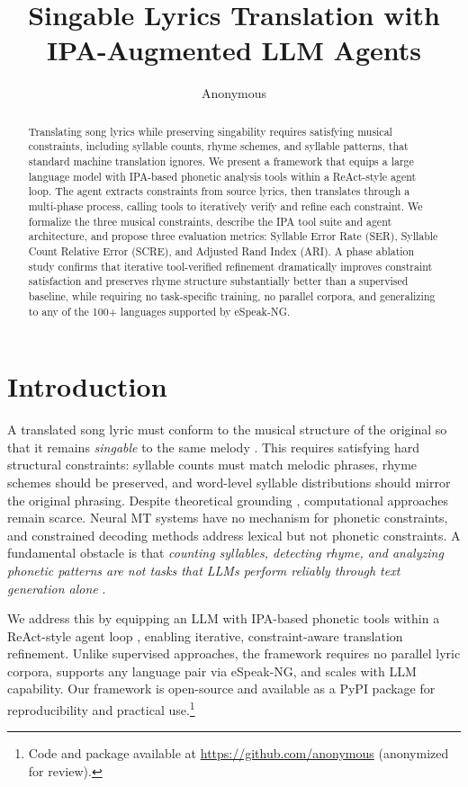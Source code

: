 \documentclass[11pt]{article}
\title{Singable Lyrics Translation with IPA-Augmented LLM Agents}
\author{Anonymous}
\begin{document}
\maketitle

\begin{abstract}
Translating song lyrics while preserving singability requires satisfying musical constraints, including syllable counts, rhyme schemes, and syllable patterns, that standard machine translation ignores.
We present a framework that equips a large language model with IPA-based phonetic analysis tools within a ReAct-style agent loop.
The agent extracts constraints from source lyrics, then translates through a multi-phase process, calling tools to iteratively verify and refine each constraint.
We formalize the three musical constraints, describe the IPA tool suite and agent architecture, and propose three evaluation metrics: Syllable Error Rate (SER), Syllable Count Relative Error (SCRE), and Adjusted Rand Index (ARI).
A phase ablation study confirms that iterative tool-verified refinement dramatically improves constraint satisfaction and preserves rhyme structure substantially better than a supervised baseline, while requiring no task-specific training, no parallel corpora, and generalizing to any of the 100+ languages supported by eSpeak-NG.
\end{abstract}

\section{Introduction}

A translated song lyric must conform to the musical structure of the original so that it remains \emph{singable} to the same melody \citep{low-2005-pentathlon}.
This requires satisfying hard structural constraints: syllable counts must match melodic phrases, rhyme schemes should be preserved, and word-level syllable distributions should mirror the original phrasing.
Despite theoretical grounding \citep{low-2005-pentathlon,franzon-2008-choices}, computational approaches remain scarce.
Neural MT systems have no mechanism for phonetic constraints, and constrained decoding methods \citep{hokamp-liu-2017-lexically,post-vilar-2018-fast} address lexical but not phonetic constraints.
A fundamental obstacle is that \emph{counting syllables, detecting rhyme, and analyzing phonetic patterns are not tasks that LLMs perform reliably through text generation alone} \citep{gao-etal-2023-pal}.

We address this by equipping an LLM with IPA-based phonetic tools within a ReAct-style agent loop \citep{yao-etal-2023-react}, enabling iterative, constraint-aware translation refinement.
Unlike supervised approaches, the framework requires no parallel lyric corpora, supports any language pair via eSpeak-NG, and scales with LLM capability.
Our framework is open-source and available as a PyPI package for reproducibility and practical use.\footnote{Code and package available at \url{https://github.com/anonymous} (anonymized for review).}
\end{document}
